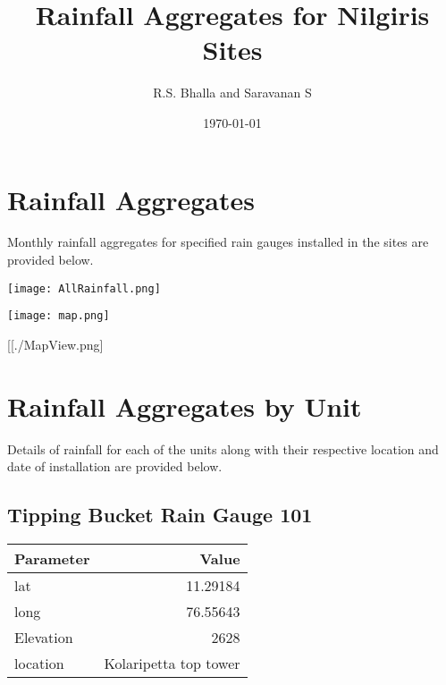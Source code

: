 \documentclass[a4paper]{article}
\author{R.S. Bhalla and Saravanan S}
\date{\today}
\title{Rainfall Aggregates for Nilgiris Sites}
\begin{document}
\maketitle
\setcounter{tocdepth}{2}
\tableofcontents


\section*{Rainfall Aggregates}
\label{sec:orgc45375e}

Monthly rainfall aggregates for specified rain gauges installed in the sites are provided below.

\begin{center}
\texttt{[image: AllRainfall.png]}
\end{center}

\newpage

\begin{center}
\texttt{[image: map.png]}
\end{center}

[[./MapView.png]

\section*{}
\label{sec:org945757e}
\section*{}
\label{sec:org0dd3948}
\section*{Rainfall Aggregates by Unit}
\label{sec:org0fd72d8}

Details of rainfall for each of the units along with their respective location and date of installation are provided below.     

\newpage

\subsection*{Tipping Bucket Rain Gauge 101}
\label{sec:orgb4da1bf}

\begin{center}
\begin{tabular}{lr}
Parameter & Value\\
\hline
lat & 11.29184\\
long & 76.55643\\
Elevation & 2628\\
location & Kolaripetta top tower\\
\end{tabular}
\end{center}
\end{document}
